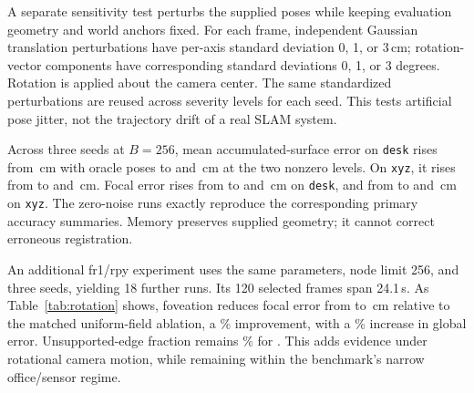 A separate sensitivity test perturbs the supplied poses while keeping evaluation geometry and world anchors fixed. For each frame, independent Gaussian translation perturbations have per-axis standard deviation 0, 1, or 3\,cm; rotation-vector components have corresponding standard deviations 0, 1, or 3 degrees. Rotation is applied about the camera center. The same standardized perturbations are reused across severity levels for each seed. This tests artificial pose jitter, not the trajectory drift of a real SLAM system.

Across three seeds at $B=256$, mean accumulated-surface error on \texttt{desk} rises from \DeskPoseZeroSeen{}\,cm with oracle poses to \DeskPoseOneSeen{} and \DeskPoseThreeSeen{}\,cm at the two nonzero levels. On \texttt{xyz}, it rises from \XyzPoseZeroSeen{} to \XyzPoseOneSeen{} and \XyzPoseThreeSeen{}\,cm. Focal error rises from \DeskPoseZeroFocus{} to \DeskPoseOneFocus{} and \DeskPoseThreeFocus{}\,cm on \texttt{desk}, and from \XyzPoseZeroFocus{} to \XyzPoseOneFocus{} and \XyzPoseThreeFocus{}\,cm on \texttt{xyz}. The zero-noise runs exactly reproduce the corresponding primary accuracy summaries. Memory preserves supplied geometry; it cannot correct erroneous registration.


An additional fr1/rpy experiment uses the same parameters, node limit 256, and three seeds, yielding 18 further runs. Its 120 selected frames span 24.1\,s. As Table~\ref{tab:rotation} shows, foveation reduces focal error from \RpyUniformFocus{} to \RpyMemoryFocus{}\,cm relative to the matched uniform-field ablation, a \RpyFocusGain\% improvement, with a \RpyGlobalCost\% increase in global error. Unsupported-edge fraction remains \RpyMemoryEdge\% for \method{}. This adds evidence under rotational camera motion, while remaining within the benchmark's narrow office/sensor regime.
